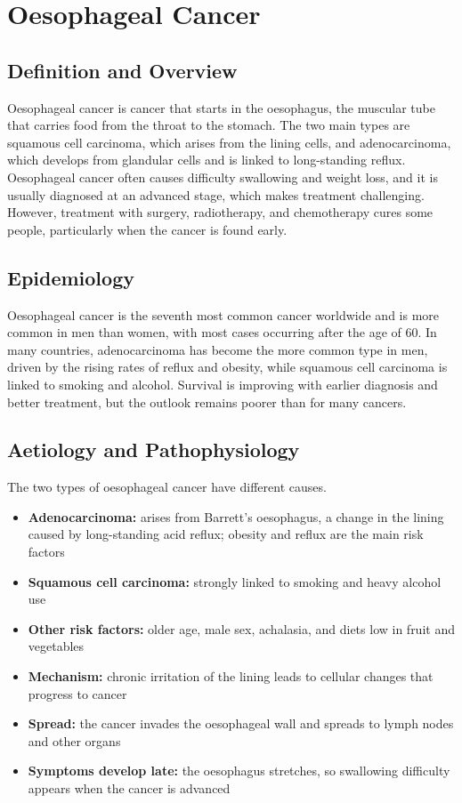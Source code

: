\chapter{Oesophageal Cancer}

\section*{Definition and Overview}
Oesophageal cancer is cancer that starts in the oesophagus, the muscular tube that carries food from the throat to the stomach. The two main types are squamous cell carcinoma, which arises from the lining cells, and adenocarcinoma, which develops from glandular cells and is linked to long-standing reflux. Oesophageal cancer often causes difficulty swallowing and weight loss, and it is usually diagnosed at an advanced stage, which makes treatment challenging. However, treatment with surgery, radiotherapy, and chemotherapy cures some people, particularly when the cancer is found early.

\section*{Epidemiology}
Oesophageal cancer is the seventh most common cancer worldwide and is more common in men than women, with most cases occurring after the age of 60. In many countries, adenocarcinoma has become the more common type in men, driven by the rising rates of reflux and obesity, while squamous cell carcinoma is linked to smoking and alcohol. Survival is improving with earlier diagnosis and better treatment, but the outlook remains poorer than for many cancers.

\section*{Aetiology and Pathophysiology}
The two types of oesophageal cancer have different causes.
\begin{itemize}
    \item \textbf{Adenocarcinoma:} arises from Barrett's oesophagus, a change in the lining caused by long-standing acid reflux; obesity and reflux are the main risk factors
    \item \textbf{Squamous cell carcinoma:} strongly linked to smoking and heavy alcohol use
    \item \textbf{Other risk factors:} older age, male sex, achalasia, and diets low in fruit and vegetables
    \item \textbf{Mechanism:} chronic irritation of the lining leads to cellular changes that progress to cancer
    \item \textbf{Spread:} the cancer invades the oesophageal wall and spreads to lymph nodes and other organs
    \item \textbf{Symptoms develop late:} the oesophagus stretches, so swallowing difficulty appears when the cancer is advanced
\end{itemize}

